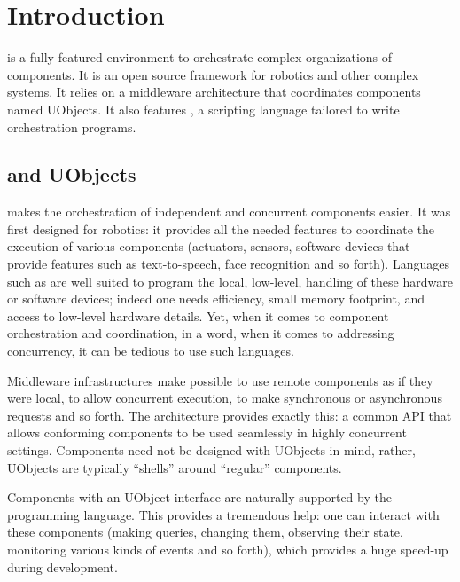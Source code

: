 
\chapter{Introduction}

\usdk is a fully-featured environment to orchestrate complex organizations
of components.  It is an open source framework for robotics and other
complex systems.  It relies on a middleware architecture that coordinates
components named UObjects.  It also features \us, a scripting language
tailored to write orchestration programs.

\section{\urbi and UObjects}

\urbi makes the orchestration of independent and concurrent components
easier.  It was first designed for robotics: it provides all the needed
features to coordinate the execution of various components (actuators,
sensors, software devices that provide features such as text-to-speech, face
recognition and so forth).  Languages such as \Cxx are well suited to
program the local, low-level, handling of these hardware or software
devices; indeed one needs efficiency, small memory footprint, and access to
low-level hardware details.  Yet, when it comes to component orchestration
and coordination, in a word, when it comes to addressing concurrency, it can
be tedious to use such languages.

Middleware infrastructures make possible to use remote components as if they
were local, to allow concurrent execution, to make synchronous or
asynchronous requests and so forth.  The  \Cxx architecture
provides exactly this: a common API that allows conforming components to be
used seamlessly in highly concurrent settings.  Components need not be
designed with UObjects in mind, rather, UObjects are typically ``shells''
around ``regular'' components.

Components with an UObject interface are naturally supported by the \us
programming language.  This provides a tremendous help: one can interact
with these components (making queries, changing them, observing their state,
monitoring various kinds of events and so forth), which provides a huge
speed-up during development.

